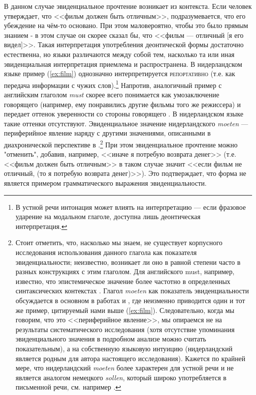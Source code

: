 В данном случае эвиденциальное прочтение возникает из контекста. Если человек утверждает, что <<фильм должен быть отличным>>, подразумевается, что его убеждение на чём-то основано. При этом маловероятно, чтобы это было прямым знанием - в этом случае он скорее сказал бы, что <<фильм --- отличный [я его видел]>>. Такая интерпретация употребления деонтической формы достаточно естественна, но языки различаются между собой тем, насколько та или иная эвиденциальная интерпретация приемлема и распространена. В нидерландском языке пример (\ref{ex:film}) однозначно интерпретируется \textsc{репортативно} (т.е. как передача информации с чужих слов).\footnote{В устной речи интонация может влиять на интерпретацию --- если фразовое ударение на модальном глаголе, доступна лишь деонтическая интерпретация.} Напротив, аналогичный пример с английским глаголом \textit{must} скорее всего понимается как умозаключение говорящего (например, ему понравились другие фильмы того же режиссера) и передает оттенок уверенности со стороны говорящего \citep[81]{auweraplungian1998}. В нидерландском языке такие оттенки отсутствуют. Эвиденциальное значение нидерландского \textit{moeten} --- периферийное явление наряду с другими значениями, описанными в диахронической перспективе в \citep{olbertzhonselaar2017}.\footnote{Стоит отметить, что, насколько мы знаем, не существует корпусного исследования использования данного глагола как показателя эвиденциальности; неизвестно, возникает ли оно в равной степени часто в разных конструкциях с этим глаголом. Для английского must, например, известно, что эпистемическое значение более частотно в определенных синтаксических контекстах \citep{dehaan2012must}. Глагол \textit{moeten} как показатель эвиденциальности обсуждается в основном в работах \citep{dehaan1997} и \citep{dehaan1999}, где неизменно приводится один и тот же пример, цитируемый нами выше (\ref{ex:film}). Следовательно, когда мы говорим, что это <<периферийное явление>>, мы опираемся не на результаты систематического исследования (хотя отсутствие упоминания эвиденциального значения в подробном анализе \citep{olbertzhonselaar2017} можно считать показательным), а на собственную языковую интуицию (нидерландский является родным для автора настоящего исследования). Кажется по крайней мере, что нидерландский \textit{moeten} более характерен для устной речи и не является аналогом немецкого \textit{sollen}, который широко употребляется в письменной речи, см. например \citep{vanderbiesen2018}.} При этом эвиденциальное прочтение можно "отменить", добавив, например, <<иначе я потребую возврата денег>> (т.е. <<фильм должен быть отличным>> в таком случае значит <<если фильм не отличный, (то я потребую возврата денег)>>). Это подтверждает, что форма не является примером грамматического выражения эвиденциальности.
